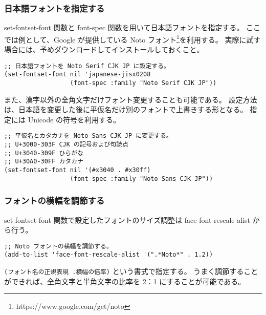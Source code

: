 \subsubsection{日本語フォントを指定する}
set-fontset-font 関数と font-spec 関数を用いて日本語フォントを指定する。
ここでは例として、Google が提供している Noto フォント\footnote{https://www.google.com/get/noto}を利用する。
実際に試す場合には、予めダウンロードしてインストールしておくこと。
\begin{mdframed}[roundcorner=0.50zw,leftmargin=3.00zw,rightmargin=3.00zw,skipabove=0.40zw,skipbelow=0.40zw,innertopmargin=4.00pt,innerbottommargin=4.00pt,innerleftmargin=5.00pt,innerrightmargin=5.00pt,linecolor=gray!020,linewidth=0.50pt,backgroundcolor=gray!20]
\begin{verbatim}
;; 日本語フォントを Noto Serif CJK JP に設定する。
(set-fontset-font nil 'japanese-jisx0208
                  (font-spec :family "Noto Serif CJK JP"))
\end{verbatim}
\end{mdframed}
また、漢字以外の全角文字だけフォント変更することも可能である。
設定方法は、日本語を変更した後に平仮名だけ別のフォントで上書きする形となる。
指定には Unicode の符号を利用する。
\begin{mdframed}[roundcorner=0.50zw,leftmargin=3.00zw,rightmargin=3.00zw,skipabove=0.40zw,skipbelow=0.40zw,innertopmargin=4.00pt,innerbottommargin=4.00pt,innerleftmargin=5.00pt,innerrightmargin=5.00pt,linecolor=gray!020,linewidth=0.50pt,backgroundcolor=gray!20]
\begin{verbatim}
;; 平仮名とカタカナを Noto Sans CJK JP に変更する。
;; U+3000-303F CJK の記号および句読点
;; U+3040-309F ひらがな
;; U+30A0-30FF カタカナ
(set-fontset-font nil '(#x3040 . #x30ff)
                  (font-spec :family "Noto Sans CJK JP"))
\end{verbatim}
\end{mdframed}
\subsubsection{フォントの横幅を調節する}
set-fontset-font 関数で設定したフォントのサイズ調整は face-font-rescale-alist から行う。\enlargethispage{0.35zw}
\begin{mdframed}[roundcorner=0.50zw,leftmargin=3.00zw,rightmargin=3.00zw,skipabove=0.40zw,skipbelow=0.40zw,innertopmargin=4.00pt,innerbottommargin=4.00pt,innerleftmargin=5.00pt,innerrightmargin=5.00pt,linecolor=gray!020,linewidth=0.50pt,backgroundcolor=gray!20]
\begin{verbatim}
;; Noto フォントの横幅を調節する。
(add-to-list 'face-font-rescale-alist '(".*Noto*" . 1.2))
\end{verbatim}
\end{mdframed}
\texttt{(フォント名の正規表現 .\hphantom{.}横幅の倍率)} という書式で指定する。
うまく調節することができれば、全角文字と半角文字の比率を 2：1 にすることが可能である。

